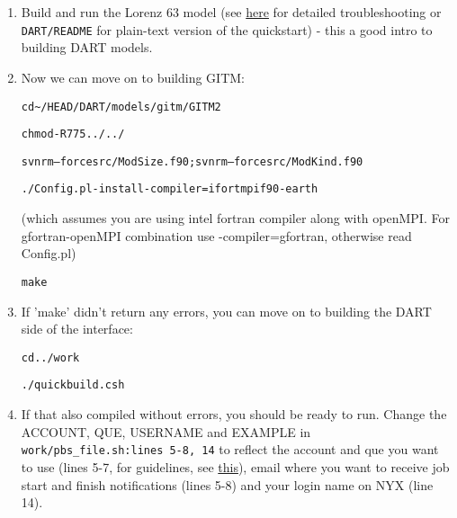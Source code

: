 \documentclass[letterpaper, 11 pt]{article}
\newenvironment{code} %
 {\quote\small\begin{alltt}} 
 {\end{alltt}\endquote}
\newcommand{\file}[1]{ {\tt \color{red} #1} }
\newcommand{\user}[1]{ {\tt \color{mauve} #1} }
\newcommand{\cmd}[1]{\begin{alltt}\colorbox{p_gr}{#1}\end{alltt} }
\begin{document}
\begin{enumerate}

\item Build and run the Lorenz 63 model (see \href{http://www.image.ucar.edu/DAReS/DART/DART_Starting.php}{here} for detailed troubleshooting or \file{DART/README} for plain-text version of the quickstart) - this a good intro to building DART models.

\item Now we can move on to building GITM:
\cmd{cd \textasciitilde/HEAD/DART/models/gitm/GITM2} 
\cmd{chmod -R 775 ../../}
\cmd{svn rm --force src/ModSize.f90; svn rm --force src/ModKind.f90}
\cmd{./Config.pl -install -compiler=ifortmpif90 -earth} 
(which assumes you are using intel fortran compiler along with openMPI. For gfortran-openMPI combination use -compiler=gfortran, otherwise read Config.pl) 
\cmd{make}

\item If 'make' didn't return any errors, you can move on to building the DART side of the interface:
\cmd{cd ../work}
\cmd{./quickbuild.csh}

\item If that also compiled without errors, you should be ready to run. Change the ACCOUNT, QUE, USERNAME and EXAMPLE in \file{work/pbs\_file.sh:lines 5-8, 14} to reflect the account and que you want to use (lines 5-7, for guidelines, see \href{http://cac.engin.umich.edu/resources/systems/nyxV2/pbs.html}{this}), email where you want to receive job start and finish notifications (lines 5-8) and your login name on NYX (line 14).


\end{enumerate}
\end{document}
